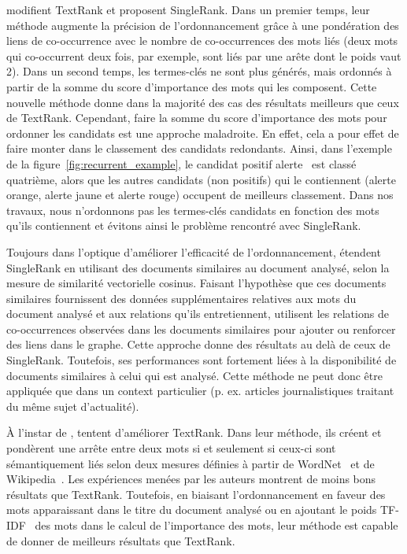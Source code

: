      modifient TextRank et proposent SingleRank. Dans
    un premier temps, leur méthode augmente la précision de l'ordonnancement
    grâce à une pondération des liens de co-occurrence avec le nombre de
    co-occurrences des mots liés (deux mots qui co-occurrent deux fois, par
    exemple, sont liés par une arête dont le poids vaut 2).
    Dans un second temps, les termes-clés ne sont plus générés, mais ordonnés à
    partir de la somme du score d'importance des mots qui les composent. Cette
    nouvelle méthode donne dans la majorité des cas des résultats meilleurs que
    ceux de TextRank. Cependant, faire la somme du score d'importance des
    mots pour ordonner les candidats est une approche maladroite. En effet, cela
    a pour effet de faire monter dans le classement des candidats redondants.
    Ainsi, dans l'exemple de la figure~\ref{fig:recurrent_example}, le candidat
    positif \og{}alerte~\fg{} est classé quatrième, alors que les autres
    candidats (non positifs) qui le contiennent (\og{}alerte orange\fg{},
    \og{}alerte jaune\fg{} et \og{}alerte rouge\fg{}) occupent de meilleurs
    classement. Dans nos travaux, nous n'ordonnons pas les termes-clés candidats
    en fonction des mots qu'ils contiennent et évitons ainsi le problème
    rencontré avec SingleRank.

    Toujours dans l'optique d'améliorer l'efficacité de l'ordonnancement,
     étendent SingleRank en utilisant des documents
    similaires au document analysé, selon la mesure de similarité vectorielle
    cosinus. Faisant l'hypothèse que ces documents similaires fournissent des
    données supplémentaires relatives aux mots du document analysé et aux
    relations qu'ils entretiennent,  utilisent les
    relations de co-occurrences observées dans les documents similaires pour
    ajouter ou renforcer des liens dans le graphe. Cette approche donne des
    résultats au delà de ceux de SingleRank. Toutefois, ses performances sont
    fortement liées à la disponibilité de documents similaires à celui qui est
    analysé. Cette méthode ne peut donc être appliquée que dans un context
    particulier (p. ex. articles journalistiques traitant du même sujet
    d'actualité).

    À l'instar de ,
     tentent d'améliorer TextRank. Dans
    leur méthode, ils créent et pondèrent une arrête entre deux mots si et
    seulement si ceux-ci sont sémantiquement liés selon deux mesures définies à
    partir de WordNet~\cite{miller1995wordnet} et de
    Wikipedia~\cite{milne2008wikipediasemanticrelatedness}. Les expériences
    menées par les auteurs montrent de moins bons résultats que TextRank.
    Toutefois, en biaisant l'ordonnancement en faveur des mots apparaissant dans
    le titre du document analysé ou en ajoutant le poids
    TF-IDF~\cite{jones1972tfidf} des mots dans le calcul de l'importance des
    mots, leur méthode est capable de donner de meilleurs résultats que
    TextRank. 

